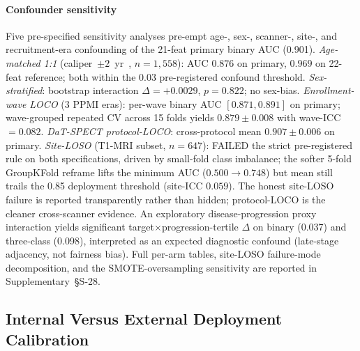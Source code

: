 \paragraph*{Confounder sensitivity}
\label{p1:sec:discussion:confounders}
Five pre-specified sensitivity analyses pre-empt age-, sex-, scanner-, site-, and recruitment-era confounding of the 21-feat primary binary AUC (0.901). \textit{Age-matched 1:1} (caliper~$\pm 2$~yr~\cite{austin2011caliper}, $n{=}1{,}558$): AUC $0.876$ on primary, $0.969$ on 22-feat reference; both within the 0.03 pre-registered confound threshold. \textit{Sex-stratified}: bootstrap interaction $\Delta{=}{+}0.0029$, $p{=}0.822$; no sex-bias. \textit{Enrollment-wave LOCO} (3 PPMI eras): per-wave binary AUC $[0.871, 0.891]$ on primary; wave-grouped repeated CV across 15 folds yields $0.879 \pm 0.008$ with wave-ICC$=0.082$. \textit{DaT-SPECT protocol-LOCO}: cross-protocol mean $0.907 \pm 0.006$ on primary. \textit{Site-LOSO} (T1-MRI subset, $n{=}647$): FAILED the strict pre-registered rule on both specifications, driven by small-fold class imbalance; the softer 5-fold GroupKFold reframe lifts the minimum AUC ($0.500 \to 0.748$) but mean still trails the 0.85 deployment threshold (site-ICC $0.059$). The honest site-LOSO failure is reported transparently rather than hidden; protocol-LOCO is the cleaner cross-scanner evidence. An exploratory disease-progression proxy interaction yields significant target$\times$progression-tertile $\Delta$ on binary (0.037) and three-class (0.098), interpreted as an expected diagnostic confound (late-stage adjacency, not fairness bias). Full per-arm tables, site-LOSO failure-mode decomposition, and the SMOTE-oversampling sensitivity are reported in Supplementary~\S{}S-28.

\subsection{Internal Versus External Deployment Calibration}
\label{p1:sec:discussion:internal-vs-external}

